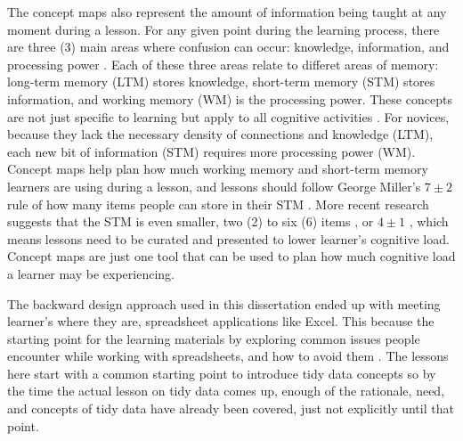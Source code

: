 \documentclass[010-intro.tex]{subfiles}
\begin{document}
        The concept maps also represent the amount of information being taught at any moment during a lesson.
        For any given point during the learning process,
        there are three (3) main areas where confusion can occur:
        knowledge, information, and processing power \cite{hermansProgrammerBrain2021}.
        Each of these three areas relate to differet areas of memory:
        long-term memory (LTM) stores knowledge,
        short-term memory (STM) stores information, and
        working memory (WM) is the processing power.
        These concepts are not just specific to learning but apply to all cognitive activities
        \cite{hermansProgrammerBrain2021}.
        For novices, because they lack the necessary density of connections and knowledge (LTM),
        each new bit of information (STM) requires more processing power (WM).
        Concept maps help plan how much working memory and short-term memory learners are using during a lesson,
        and lessons should follow George Miller's $7\pm2$ rule of how many items people can store in their STM
        \cite{miller1956magical}.
        More recent research suggests that the STM is even smaller, two (2) to six (6) items
        \cite{hermansProgrammerBrain2021},
        or $4\pm1$ \cite{didauWhatEveryTeacher2016},
        which means lessons need to be curated and presented to lower learner's cognitive load.
        Concept maps are just one tool that can be used to plan how much cognitive load a learner may be experiencing.

        The backward design approach used in this dissertation ended up with meeting learner's where they are,
        spreadsheet applications like Excel.
        This because the starting point for the learning materials by exploring common issues people encounter while
        working with spreadsheets, and how to avoid them
        \cite{bromanDataOrganizationSpreadsheets2018}.
        The lessons here start with a common starting point to introduce tidy data concepts so by
        the time the actual lesson on tidy data comes up,
        enough of the rationale, need, and concepts of tidy data have already been covered,
        just not explicitly until that point.
\end{document}
